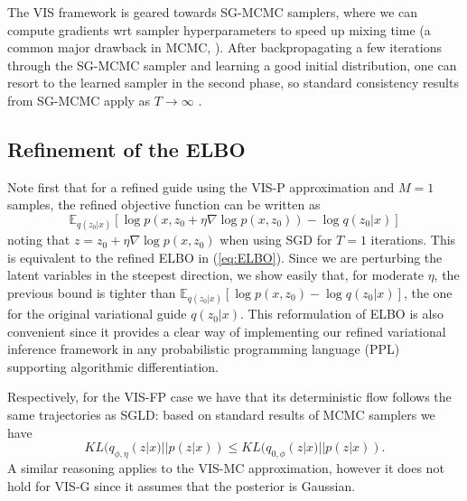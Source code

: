 The VIS framework is geared towards SG-MCMC samplers, where we can compute gradients wrt sampler hyperparameters to speed up mixing time (a common major drawback in MCMC, \cite{graves2011automatic}).
After backpropagating a few iterations through the SG-MCMC sampler and learning a good initial distribution, one can resort to the learned sampler in the second phase, so standard consistency results from SG-MCMC apply as $T \rightarrow \infty$ \cite{brooks2011handbook}.

\subsection{Refinement of the ELBO}\label{sec:rewriting}

 Note first that for a refined guide using the VIS-P approximation and $M=1$ samples, the refined objective function can be written as 
$$
 \mathbb{E}_{q(z_0|x)} \left[ \log p(x, z_0 + \eta \nabla \log p(x,z_0) ) - \log q(z_0 | x)\right]
$$
noting that $z = z_0 + \eta \nabla \log p(x,z_0)$ when using SGD for $T=1$ iterations.
This is equivalent to the refined ELBO in (\ref{eq:ELBO}). Since we are perturbing the latent variables in the steepest direction, we show easily that, for moderate $\eta$, the previous bound is tighter than
$\mathbb{E}_{q(z_0|x)} \left[ \log p(x, z_0  ) - \log q(z_0 | x)\right]$, the one for the original variational guide $q(z_0 | x)$. This reformulation of ELBO is also convenient since it provides a clear way of implementing our refined variational inference framework in any probabilistic 
programming language (PPL) supporting algorithmic differentiation.

Respectively, for the VIS-FP case we have that its 
deterministic flow follows the same trajectories as SGLD: 
based on standard results of MCMC samplers \cite{murray2008notes} we have 
$$
KL(q_{\phi,\eta}(z|x) ||  p(z|x)) \leq KL(q_{0, \phi}(z|x) ||  p(z|x)).
$$
A similar reasoning applies to the VIS-MC approximation, however it does not hold for VIS-G since it assumes that the posterior is   Gaussian.

